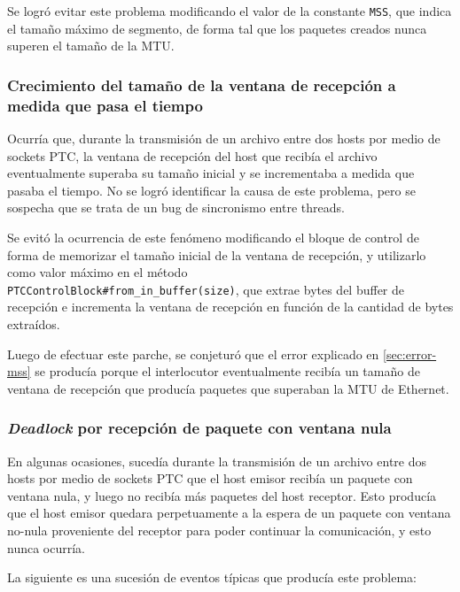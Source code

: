 \documentclass[a4paper, 10pt, twoside]{article}
\begin{document}
Se logró evitar este problema modificando el valor de la constante \texttt{MSS}, que indica el tamaño máximo de segmento, de forma tal que los paquetes creados nunca superen el tamaño de la MTU.


\subsubsection{Crecimiento del tamaño de la ventana de recepción a medida que pasa el tiempo}

Ocurría que, durante la transmisión de un archivo entre dos hosts por medio de sockets PTC, la ventana de recepción del host que recibía el archivo eventualmente superaba su tamaño inicial y se incrementaba a medida que pasaba el tiempo. No se logró identificar la causa de este problema, pero se sospecha que se trata de un bug de sincronismo entre threads.

Se evitó la ocurrencia de este fenómeno modificando el bloque de control de forma de memorizar el tamaño inicial de la ventana de recepción, y utilizarlo como valor máximo en el método \\ \texttt{PTCControlBlock\#from\_in\_buffer(size)}, que extrae bytes del buffer de recepción e incrementa la ventana de recepción en función de la cantidad de bytes extraídos.

Luego de efectuar este parche, se conjeturó que el error explicado en \ref{sec:error-mss} se producía porque el interlocutor eventualmente recibía un tamaño de ventana de recepción que producía paquetes que superaban la MTU de Ethernet.


\subsubsection{\emph{Deadlock} por recepción de paquete con ventana nula}

En algunas ocasiones, sucedía durante la transmisión de un archivo entre dos hosts por medio de sockets PTC que el host emisor recibía un paquete con ventana nula, y luego no recibía más paquetes del host receptor. Esto producía que el host emisor quedara perpetuamente a la espera de un paquete con ventana no-nula proveniente del receptor para poder continuar la comunicación, y esto nunca ocurría.

La siguiente es una sucesión de eventos típicas que producía este problema:
\end{document}
